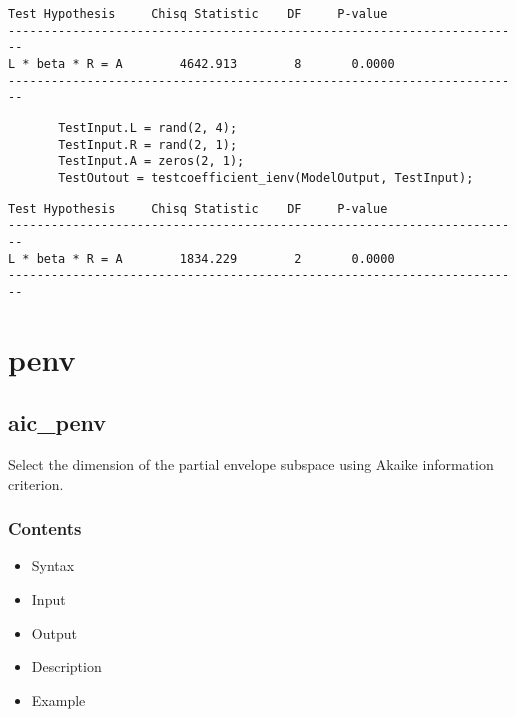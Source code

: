 \documentclass[a4paper,11pt,openany]{memoir}
\begin{document}
        \color{lightgray}\ttfamily \begin{verbatim}
Test Hypothesis     Chisq Statistic    DF     P-value
------------------------------------------------------------------------
L * beta * R = A        4642.913        8       0.0000
------------------------------------------------------------------------
\end{verbatim} \rmfamily
\color{black}
\begin{verbatim}       TestInput.L = rand(2, 4);
       TestInput.R = rand(2, 1);
       TestInput.A = zeros(2, 1);
       TestOutout = testcoefficient_ienv(ModelOutput, TestInput);\end{verbatim}
    
        \color{lightgray}\ttfamily \begin{verbatim}
Test Hypothesis     Chisq Statistic    DF     P-value
------------------------------------------------------------------------
L * beta * R = A        1834.229        2       0.0000
------------------------------------------------------------------------
\end{verbatim} \rmfamily
\color{black}
    
\newpage 
    
\chapter{penv}

\rmfamily
\color{black}\section{aic\_penv}

\begin{par}
Select the dimension of the partial envelope subspace using Akaike information criterion.
\end{par} \vspace{1em}

\subsection*{Contents}

\begin{itemize}
\setlength{\itemsep}{-1ex}
   \item Syntax
   \item Input
   \item Output
   \item Description
   \item Example
\end{itemize}
\end{document}
